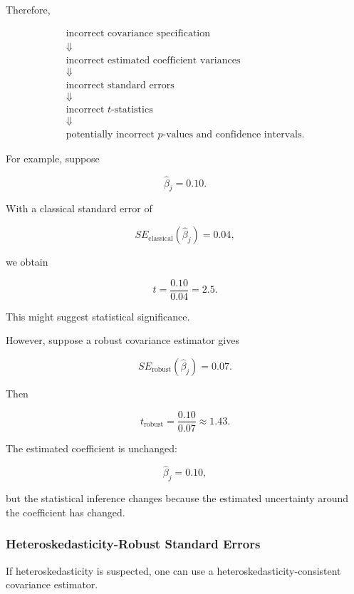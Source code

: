 Therefore,

\[
\boxed{
\begin{array}{c}
\text{incorrect covariance specification}
\\
\Downarrow
\\
\text{incorrect estimated coefficient variances}
\\
\Downarrow
\\
\text{incorrect standard errors}
\\
\Downarrow
\\
\text{incorrect }t\text{-statistics}
\\
\Downarrow
\\
\text{potentially incorrect }p\text{-values and confidence intervals}.
\end{array}
}
\]

For example, suppose

\[
\widehat{\beta}_j=0.10.
\]

With a classical standard error of

\[
SE_{\mathrm{classical}}
(\widehat{\beta}_j)
=
0.04,
\]

we obtain

\[
t
=
\frac{0.10}{0.04}
=
2.5.
\]

This might suggest statistical significance.

However, suppose a robust covariance estimator gives

\[
SE_{\mathrm{robust}}
(\widehat{\beta}_j)
=
0.07.
\]

Then

\[
t_{\mathrm{robust}}
=
\frac{0.10}{0.07}
\approx1.43.
\]

The estimated coefficient is unchanged:

\[
\boxed{
\widehat{\beta}_j=0.10,
}
\]

but the statistical inference changes because the estimated uncertainty
around the coefficient has changed.



\subsubsection*{Heteroskedasticity-Robust Standard Errors}

If heteroskedasticity is suspected, one can use a
heteroskedasticity-consistent covariance estimator.

